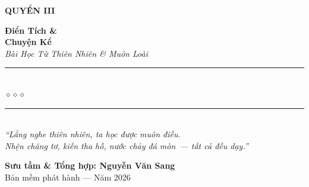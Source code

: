 \begin{titlepage}
\begin{center}
  \begin{tcolorbox}[
    width=6.5cm,
    colback=truyengold!20,
    colframe=truyengold!80!black,
    arc=4pt,
    boxrule=1.5pt,
    halign=center
  ]
    {\fontsize{18}{22}\selectfont\bfseries\color{truyenred!80!black}
     QUYỂN III}
  \end{tcolorbox}
  \vspace{0.8cm}

  {\fontsize{38}{45}\selectfont\bfseries\color{truyenred!80!black}
    Điển Tích \&}\\[0.4cm]
  {\fontsize{38}{45}\selectfont\bfseries\color{truyengold!80!black}
    Chuyện Kể}\\[0.4cm]

  {\fontsize{16}{20}\selectfont\color{truyengold!90!black}\itshape
    Bài Học Từ Thiên Nhiên \& Muôn Loài}\\[1cm]

  {\color{truyenblue!60}\rule{6cm}{1pt}}\\[5pt]
  {\color{truyengold!80!black}\large$\diamond$\hspace{1cm}$\diamond$\hspace{1cm}$\diamond$}\\[5pt]
  {\color{truyenblue!60}\rule{6cm}{1pt}}\\[1.5cm]

  {\normalsize\itshape\color{truyenblue!90!black}
   ``Lắng nghe thiên nhiên, ta học được muôn điều.\\
   Nhện chăng tơ, kiến tha hồ, nước chảy đá mòn~--- tất cả đều dạy.''}

  \vfill

  {\fontsize{16}{20}\selectfont\bfseries\color{truyenblue!90!black}
    Sưu tầm \& Tổng hợp: \textbf{Nguyễn Văn Sang}}\\[0.4cm]

  {\small\color{gray} Bản mềm phát hành --- Năm 2026}\\[0.5cm]
\end{center}

\afterpage{\nopagecolor}
\end{titlepage}